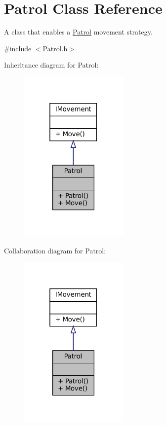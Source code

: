 \hypertarget{classPatrol}{}\section{Patrol Class Reference}
\label{classPatrol}


A class that enables a \hyperlink{classPatrol}{Patrol} movement strategy.  




{\ttfamily \#include $<$Patrol.\+h$>$}



Inheritance diagram for Patrol\+:\nopagebreak
\begin{figure}[H]
\begin{center}
\leavevmode
\includegraphics[width=151pt]{classPatrol__inherit__graph}
\end{center}
\end{figure}


Collaboration diagram for Patrol\+:\nopagebreak
\begin{figure}[H]
\begin{center}
\leavevmode
\includegraphics[width=151pt]{classPatrol__coll__graph}
\end{center}
\end{figure}
